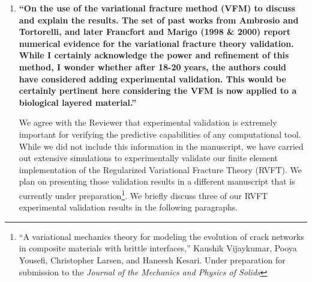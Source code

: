 \documentclass[11pt,letterpaper]{report}
\begin{document}
\begin{enumerate}[label=\textit{2.\arabic*},wide, labelwidth=!, labelindent=0pt]

\item \label{r2c1} {\bf ``On the use of the variational fracture method (VFM) to discuss and explain the results. The set of past works from Ambrosio and Tortorelli, and later Francfort and Marigo (1998 \& 2000) report numerical evidence for the variational fracture theory validation. While I certainly acknowledge the power and refinement of this method, I wonder whether after 18-20 years, the authors could have considered adding experimental validation. This would be certainly pertinent here considering the VFM is now applied to a biological layered material.''}

We agree with the Reviewer that experimental validation is extremely important for verifying the predictive capabilities of any computational tool. While we did not include this information in the manuscript, we have carried out extensive simulations to experimentally validate our finite element implementation of the Regularized Variational Fracture Theory (RVFT). We plan on presenting those validation results in a different manuscript that is currently under preparation\footnote{``A variational mechanics theory for modeling the evolution of crack networks in composite materials with brittle interfaces,'' Kaushik Vijaykumar, Pooya Yousefi, Christopher Larsen, and Haneesh Kesari. Under preparation for submission to the \textit{Journal of the Mechanics and Physics of Solids}\label{RVFTpaper}}.  We briefly discuss three of our  RVFT experimental validation results in the following paragraphs. %




\end{enumerate}
\end{document}
